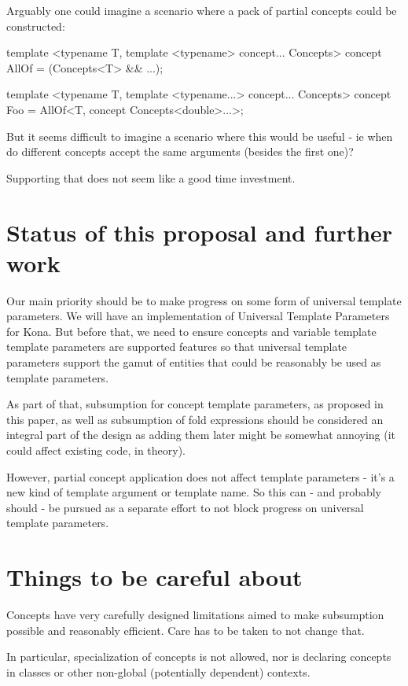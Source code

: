 \documentclass{wg21}
\begin{document}
Arguably one could imagine a scenario where a pack of partial concepts could be constructed:

\begin{colorblock}
template <typename T, template <typename> concept... Concepts>
concept AllOf  = (Concepts<T> && ...);

template <typename T, template <typename...> concept... Concepts>
concept Foo = AllOf<T, concept Concepts<double>...>;
\end{colorblock}

But it seems difficult to imagine a scenario where this would be useful - ie when do different concepts accept the same arguments (besides the first one)?

Supporting that does not seem like a good time investment.

\section{Status of this proposal and further work}

Our main priority should be to make progress on some form of universal template parameters.
We will have an implementation of Universal Template Parameters for Kona.
But before that, we need to ensure concepts and variable template template parameters are supported features so that universal
template parameters support the gamut of entities that could be reasonably be used as template parameters.

As part of that, subsumption for concept template parameters, as proposed in this paper, as well as subsumption of fold expressions
should be considered an integral part of the design as adding them later might be somewhat annoying (it could affect existing code, in theory).

However, partial concept application does not affect template parameters - it's a new kind of template argument or template name.
So this can - and probably should - be pursued as a separate effort to not block progress on universal template parameters.

\section{Things to be careful about}

Concepts have very carefully designed limitations aimed to make subsumption possible and reasonably efficient.
Care has to be taken to not change that.

In particular, specialization of concepts is not allowed, nor is declaring concepts in classes or other non-global (potentially dependent)
contexts.
\end{document}
